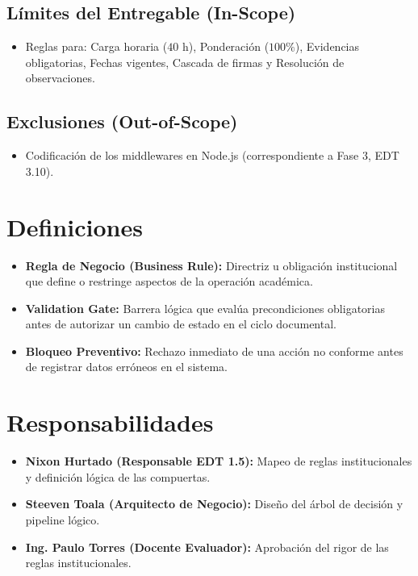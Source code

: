 \documentclass[12pt,a4paper]{article}
\begin{document}
\subsection{Límites del Entregable (In-Scope)}
\begin{itemize}[leftmargin=1.5em, itemsep=2pt]
    \item Reglas para: Carga horaria ($40\text{ h}$), Ponderación ($100\%$), Evidencias obligatorias, Fechas vigentes, Cascada de firmas y Resolución de observaciones.
\end{itemize}
\subsection{Exclusiones (Out-of-Scope)}
\begin{itemize}[leftmargin=1.5em, itemsep=2pt]
    \item Codificación de los middlewares en Node.js (correspondiente a Fase 3, EDT 3.10).
\end{itemize}

\section{Definiciones}
\begin{itemize}[leftmargin=1.5em, itemsep=2pt]
    \item \textbf{Regla de Negocio (Business Rule):} Directriz u obligación institucional que define o restringe aspectos de la operación académica.
    \item \textbf{Validation Gate:} Barrera lógica que evalúa precondiciones obligatorias antes de autorizar un cambio de estado en el ciclo documental.
    \item \textbf{Bloqueo Preventivo:} Rechazo inmediato de una acción no conforme antes de registrar datos erróneos en el sistema.
\end{itemize}

\section{Responsabilidades}
\begin{itemize}[leftmargin=1.5em, itemsep=2pt]
    \item \textbf{Nixon Hurtado (Responsable EDT 1.5):} Mapeo de reglas institucionales y definición lógica de las compuertas.
    \item \textbf{Steeven Toala (Arquitecto de Negocio):} Diseño del árbol de decisión y pipeline lógico.
    \item \textbf{Ing. Paulo Torres (Docente Evaluador):} Aprobación del rigor de las reglas institucionales.
\end{itemize}
\end{document}
